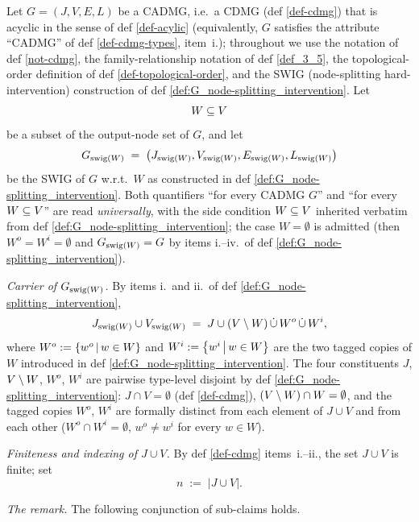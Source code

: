 \documentclass[main]{subfiles}
\begin{document}
\def\rowref{claim\_3\_9}
\label{claim_3_9}

\begin{Rem}[SwigAcyclic]
    Let $G = (J, V, E, L)$ be a CADMG, i.e.\ a CDMG (def \ref{def-cdmg}) that is acyclic in the sense of def \ref{def-acylic} (equivalently, $G$ satisfies the attribute ``CADMG'' of def \ref{def-cdmg-types}, item~i.); throughout we use the notation of def \ref{not-cdmg}, the family-relationship notation of def \ref{def_3_5}, the topological-order definition of def \ref{def-topological-order}, and the SWIG (node-splitting hard-intervention) construction of def \ref{def:G_node-splitting_intervention}. Let
    \[ W \subseteq V \]
    be a subset of the output-node set of $G$, and let
    \[ G_{\mathrm{swig}(W)} \;=\; \left ( J_{\mathrm{swig}(W)}, V_{\mathrm{swig}(W)}, E_{\mathrm{swig}(W)}, L_{\mathrm{swig}(W)} \right ) \]
    be the SWIG of $G$ w.r.t.\ $W$ as constructed in def \ref{def:G_node-splitting_intervention}. Both quantifiers ``for every CADMG $G$'' and ``for every $W \subseteq V$'' are read \emph{universally}, with the side condition $W \subseteq V$ inherited verbatim from def \ref{def:G_node-splitting_intervention}; the case $W = \emptyset$ is admitted (then $W^o = W^i = \emptyset$ and $G_{\mathrm{swig}(W)} = G$ by items i.--iv.\ of def \ref{def:G_node-splitting_intervention}).

    \emph{Carrier of $G_{\mathrm{swig}(W)}$.} By items i.\ and ii.\ of def \ref{def:G_node-splitting_intervention},
    \[
        J_{\mathrm{swig}(W)} \cup V_{\mathrm{swig}(W)} \;=\; J \cup (V \setminus W) \,\dot{\cup}\, W^o \,\dot{\cup}\, W^i,
    \]
    where $W^o := \left \{ w^o \,\middle|\, w \in W \right \}$ and $W^i := \left \{ w^i \,\middle|\, w \in W \right \}$ are the two tagged copies of $W$ introduced in def \ref{def:G_node-splitting_intervention}. The four constituents $J$, $V \setminus W$, $W^o$, $W^i$ are pairwise type-level disjoint by def \ref{def:G_node-splitting_intervention}: $J \cap V = \emptyset$ (def \ref{def-cdmg}), $(V \setminus W) \cap W = \emptyset$, and the tagged copies $W^o$, $W^i$ are formally distinct from each element of $J \cup V$ and from each other ($W^o \cap W^i = \emptyset$, $w^o \neq w^i$ for every $w \in W$).

    \emph{Finiteness and indexing of $J \cup V$.} By def \ref{def-cdmg} items~i.--ii., the set $J \cup V$ is finite; set
    \[ n \;:=\; |J \cup V|. \]

    \emph{The remark.} The following conjunction of sub-claims holds.


\end{Rem}
\end{document}
